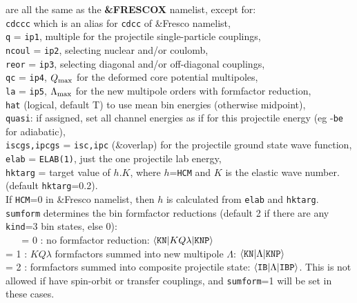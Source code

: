 \documentclass[11pt]{article}
\begin{document}
are all the same as the {\bf \&FRESCOX} namelist, except for:\\
{\tt cdccc} which is an alias for {\tt cdcc} of \&Fresco namelist,\\
{\tt q} = {\tt ip1}, multiple for the projectile single-particle couplings,\\
{\tt ncoul} = {\tt ip2}, selecting nuclear and/or coulomb,\\
{\tt reor} = {\tt ip3}, selecting diagonal and/or off-diagonal couplings,\\
{\tt qc} = {\tt ip4}, $Q_{\rm max}$ for the deformed core potential multipoles,\\
{\tt la} = {\tt ip5}, $\Lambda_{\rm max}$ for the new multipole orders with formfactor reduction,\\
{\tt hat} (logical, default T) to use mean bin energies (otherwise midpoint),\\
{\tt quasi}: if assigned, set all channel energies as if for this projectile
energy (eg -{\tt be} for adiabatic),\\
{\tt iscgs,ipcgs} = {\tt isc,ipc} (\&overlap) for the projectile ground state wave
function,\\
{\tt elab} = {\tt ELAB(1)}, just the one projectile lab energy,\\
{\tt hktarg} = target value of $h.K$, where $h$={\tt HCM} and $K$ is the elastic wave number.
(default {\tt hktarg}=0.2). \\
\hspace*{1cm} If {\tt HCM}=0 in \&Fresco namelist,
then $h$ is calculated from {\tt elab} and {\tt hktarg}.\\



{\tt sumform} determines the bin formfactor reductions
(default 2 if there are any {\tt kind}=3 bin states, else 0):\\
~ ~   = 0 : no formfactor reduction:
     $\langle {\tt KN} | K Q \lambda | {\tt KNP} \rangle$
\\    = 1 : $KQ\lambda$ formfactors summed into new multipole $\Lambda$:
     $\langle {\tt KN} | \Lambda | {\tt KNP} \rangle$
\\    = 2 : formfactors summed into composite projectile state:
     $\langle {\tt IB} | {\Lambda} | {\tt IBP} \rangle$.
      This is not allowed if have spin-orbit or transfer couplings, and
      {\tt sumform}=1 will be set in these cases.\\
\end{document}
